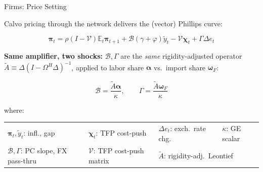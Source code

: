 \documentclass[aspectratio=43, 10pt]{beamer}
\begin{document}
\begin{frame}{Firms: Price Setting}

\footnotesize

Calvo pricing through the network delivers the (vector) Phillips curve:

\vspace{6pt}
\[
\bm\pi_t=\rho(I-\mathcal V)\mathbb E_t\bm\pi_{t+1}+\mathcal B(\gamma+\varphi)\tilde y_t-\mathcal V\bm\chi_t+\Gamma\Delta e_t
\]
\vspace{6pt}

\textbf{Same amplifier, two shocks:} $\mathcal B,\Gamma$ are the \emph{same} rigidity-adjusted operator $\tilde A\equiv\Delta(I-\Omega^H\Delta)^{-1}$, applied to labor share $\bm\alpha$ vs.\ import share $\bm\omega_F$:

\vspace{6pt}
\[
\mathcal B=\frac{\tilde A\bm\alpha}{\kappa},
\qquad
\Gamma=\frac{\tilde A\bm\omega_F}{\kappa}
\]


\vspace{10pt}
{\footnotesize where:}

\vspace{4pt}
{\scriptsize
\renewcommand{\arraystretch}{1.4}
\begin{tabular}{@{}llll@{}}
$\bm\pi_t,\tilde y_t$: infl., gap & $\bm\chi_t$: TFP cost-push & $\Delta e_t$: exch.\ rate chg.\ & $\kappa$: GE scalar \\
$\mathcal B,\Gamma$: PC slope, FX pass-thru\ & $\mathcal V$: TFP cost-push matrix & \multicolumn{2}{l}{$\tilde A$: rigidity-adj.\ Leontief} \\
\end{tabular}}

\end{frame}
\end{document}
